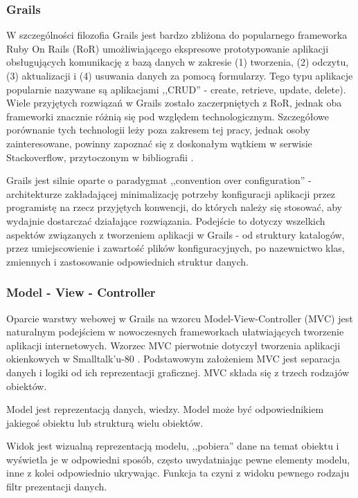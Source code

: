     \subsubsection{Grails}

    W szczególności filozofia Grails jest bardzo zbliżona do popularnego frameworka Ruby On Rails (RoR) umożliwiającego ekspresowe prototypowanie aplikacji obsługujących komunikację z bazą danych w zakresie (1) tworzenia, (2) odczytu, (3) aktualizacji i (4) usuwania danych za pomocą formularzy. Tego typu aplikacje popularnie nazywane są aplikacjami ,,CRUD'' - create, retrieve, update, delete). Wiele przyjętych rozwiązań w Grails zostało zaczerpniętych z RoR, jednak oba frameworki znacznie różnią się pod względem technologicznym. Szczegółowe porównanie tych technologii leży poza zakresem tej pracy, jednak osoby zainteresowane, powinny zapoznać się z doskonałym wątkiem w serwisie Stackoverflow, przytoczonym w bibliografii \cite{RailsGr}.

    Grails jest silnie oparte o paradygmat ,,convention over configuration'' - architekturze zakładającej minimalizację potrzeby konfiguracji aplikacji przez programistę na rzecz przyjętych konwencji, do których należy się stosować, aby wydajnie dostarczać działające rozwiązania. Podejście to dotyczy wszelkich aspektów związanych z tworzeniem aplikacji w Grails - od struktury katalogów, przez umiejscowienie i zawartość plików konfiguracyjnych, po nazewnictwo klas, zmiennych i zastosowanie odpowiednich struktur danych. 

    \subsubsection{Model - View - Controller}

    Oparcie warstwy webowej w Grails na wzorcu Model-View-Controller (MVC) jest naturalnym podejściem w nowoczesnych frameworkach ułatwiających tworzenie aplikacji internetowych. Wzorzec MVC \cite{GoF} pierwotnie dotyczył tworzenia aplikacji okienkowych w Smalltalk'u-80 \cite{coad93}. Podstawowym założeniem MVC jest separacja danych i logiki od ich reprezentacji graficznej. MVC składa się z trzech rodzajów obiektów. 
  
    Model jest reprezentacją danych, wiedzy. Model może być odpowiednikiem jakiegoś obiektu lub strukturą wielu obiektów. 

    Widok jest wizualną reprezentacją modelu, ,,pobiera'' dane na temat obiektu i wyświetla je w odpowiedni sposób, często uwydatniając pewne elementy modelu, inne z kolei odpowiednio ukrywając. Funkcja ta czyni z widoku pewnego rodzaju filtr prezentacji danych. 

